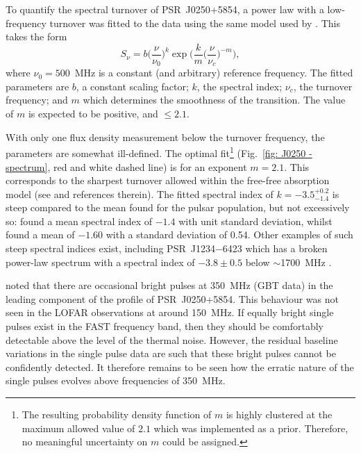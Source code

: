 To quantify the spectral turnover of PSR~J0250+5854, a power law with a low-frequency turnover was fitted to the data using the same model used by \citet{JSK+2018}. This takes the form
\begin{equation}
\label{eq: J0250 - spectrum}
    S_\nu = b \bigg(\frac{\nu}{\nu_0}\bigg)^k \exp\bigg( \frac{k}{m} \bigg(\frac{\nu}{\nu_c}\bigg)^{-m}\bigg),
\end{equation}
where $\nu_0 = 500$~MHz is a constant (and arbitrary) reference frequency. The fitted parameters are $b$, a constant scaling factor; $k$, the spectral index; $\nu_c$, the turnover frequency; and $m$ which determines the smoothness of the transition. The value of $m$ is expected to be positive, and $\leq2.1$.

With only one flux density measurement below the turnover frequency, the parameters are somewhat ill-defined. The optimal fit\footnote{The resulting probability density function of $m$ is highly clustered at the maximum allowed value of $2.1$ which was implemented as a prior. Therefore, no meaningful uncertainty on $m$ could be assigned.} (Fig.~\ref{fig: J0250 - spectrum}, red and white dashed line) is for an exponent $m=2.1$. This corresponds to the sharpest turnover allowed within the free-free absorption model (see \citet{JSK+2018} and references therein). The fitted spectral index of $k = -3.5^{+0.2}_{-1.4}$ is steep compared to the mean found for the pulsar population, but not excessively so: \citet{BLVx2013} found a mean spectral index of $-1.4$ with unit standard deviation, whilst \citet{JSK+2018} found a mean of $-1.60$ with a standard deviation of 0.54. Other examples of such steep spectral indices exist, including PSR~J1234$-$6423 which has a broken power-law spectrum with a spectral index of $-3.8\pm0.5$ below $\sim$1700~MHz \citep{JSK+2018}.

\citet{TBC+2018} noted that there are occasional bright pulses at 350~MHz (GBT data) in the leading component of the profile of PSR~J0250+5854. This behaviour was not seen in the LOFAR observations at around 150~MHz. If equally bright single pulses exist in the FAST frequency band, then they should be comfortably detectable above the level of the thermal noise. However, the residual baseline variations in the single pulse data are such that these bright pulses cannot be confidently detected. It therefore remains to be seen how the erratic nature of the single pulses evolves above frequencies of 350~MHz.











